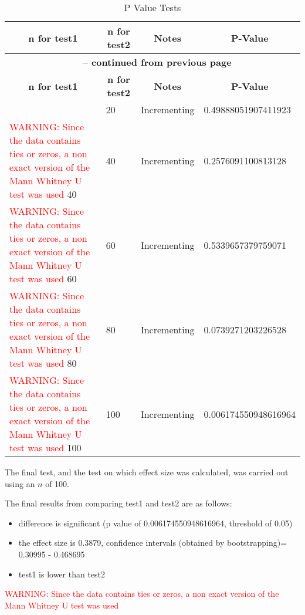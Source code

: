 \documentclass[]{article}
\begin{document}
\begin{center}
\begin{longtable}{|l|l|l|l|}
\caption[P Value Tests]{P Value Tests} \label{p value tests} \\ 
\hline \multicolumn{1}{|c|}{\textbf{n for test1}} &  \multicolumn{1}{|c|}{\textbf{n for test2}} &  \multicolumn{1}{|c|}{\textbf{Notes}} &  \multicolumn{1}{|c|}{\textbf{P-Value}}
\\ \hline 
\endfirsthead 
\multicolumn{4}{c}{{\bfseries \tablename\ \thetable{} -- continued from previous page}} \\ 
 \hline 
 \multicolumn{1}{|c|}{\textbf{n for test1}} &  \multicolumn{1}{|c|}{\textbf{n for test2}} &  \multicolumn{1}{|c|}{\textbf{Notes}} &  \multicolumn{1}{|c|}{\textbf{P-Value}}
\endhead 
\hline \multicolumn{4}{|r|}{{Continued on next page}} \\ \hline 
\endfoot 
\hline 
\endlastfoot 
20&20&Incrementing&0.49888051907411923\\

\textcolor{Red}{WARNING: Since the data contains ties or zeros, a non exact version of the Mann Whitney U test was used
}
40&40&Incrementing&0.2576091100813128\\

\textcolor{Red}{WARNING: Since the data contains ties or zeros, a non exact version of the Mann Whitney U test was used
}
60&60&Incrementing&0.5339657379759071\\

\textcolor{Red}{WARNING: Since the data contains ties or zeros, a non exact version of the Mann Whitney U test was used
}
80&80&Incrementing&0.0739271203226528\\

\textcolor{Red}{WARNING: Since the data contains ties or zeros, a non exact version of the Mann Whitney U test was used
}
100&100&Incrementing&0.006174550948616964\\

\hline
\end{longtable}
\end{center}

The final test, and the test on which effect size was calculated, was carried out using an $n$ of 100. 

The final results from comparing test1 and test2 are as follows:
\begin{itemize}
\item{difference is significant (p value of 0.006174550948616964, threshold of 0.05)}
\item{the effect size is 0.3879, confidence intervals (obtained by bootstrapping)= 0.30995 - 0.468695}
\item{test1 is lower than test2}
\end{itemize}
\textcolor{Red}{WARNING: Since the data contains ties or zeros, a non exact version of the Mann Whitney U test was used
}
\end{document}
